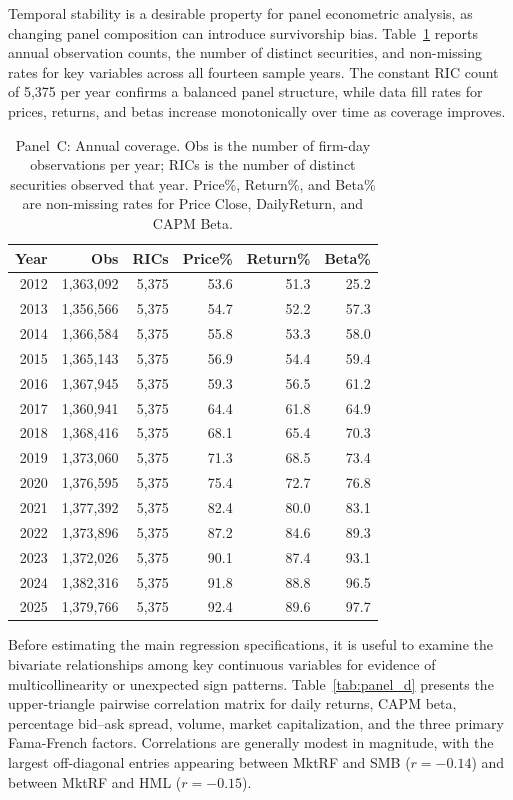 \documentclass{article}
\theoremstyle{plain}
\begin{document}
Temporal stability is a desirable property for panel econometric analysis, as changing panel composition can introduce survivorship bias. Table~\ref{tab:panel_c} reports annual observation counts, the number of distinct securities, and non-missing rates for key variables across all fourteen sample years. The constant RIC count of 5,375 per year confirms a balanced panel structure, while data fill rates for prices, returns, and betas increase monotonically over time as coverage improves.

\begin{table}[!ht]
\centering
\footnotesize
\begin{tabular}{r r r r r r}
\toprule
\textbf{Year} & \textbf{Obs} & \textbf{RICs} & \textbf{Price\%} & \textbf{Return\%} & \textbf{Beta\%} \\
\midrule
  2012 & 1,363,092 & 5,375 & 53.6 & 51.3 & 25.2 \\
  2013 & 1,356,566 & 5,375 & 54.7 & 52.2 & 57.3 \\
  2014 & 1,366,584 & 5,375 & 55.8 & 53.3 & 58.0 \\
  2015 & 1,365,143 & 5,375 & 56.9 & 54.4 & 59.4 \\
  2016 & 1,367,945 & 5,375 & 59.3 & 56.5 & 61.2 \\
  2017 & 1,360,941 & 5,375 & 64.4 & 61.8 & 64.9 \\
  2018 & 1,368,416 & 5,375 & 68.1 & 65.4 & 70.3 \\
  2019 & 1,373,060 & 5,375 & 71.3 & 68.5 & 73.4 \\
  2020 & 1,376,595 & 5,375 & 75.4 & 72.7 & 76.8 \\
  2021 & 1,377,392 & 5,375 & 82.4 & 80.0 & 83.1 \\
  2022 & 1,373,896 & 5,375 & 87.2 & 84.6 & 89.3 \\
  2023 & 1,372,026 & 5,375 & 90.1 & 87.4 & 93.1 \\
  2024 & 1,382,316 & 5,375 & 91.8 & 88.8 & 96.5 \\
  2025 & 1,379,766 & 5,375 & 92.4 & 89.6 & 97.7 \\
\bottomrule
\end{tabular}
\caption{Panel~C: Annual coverage. Obs is the number of firm-day observations per year; RICs is the number of distinct securities observed that year. Price\%, Return\%, and Beta\% are non-missing rates for Price Close, DailyReturn, and CAPM Beta.}
\label{tab:panel_c}
\end{table}

Before estimating the main regression specifications, it is useful to examine the bivariate relationships among key continuous variables for evidence of multicollinearity or unexpected sign patterns. Table~\ref{tab:panel_d} presents the upper-triangle pairwise correlation matrix for daily returns, CAPM beta, percentage bid--ask spread, volume, market capitalization, and the three primary Fama-French factors. Correlations are generally modest in magnitude, with the largest off-diagonal entries appearing between MktRF and SMB ($r = -0.14$) and between MktRF and HML ($r = -0.15$).
\end{document}
